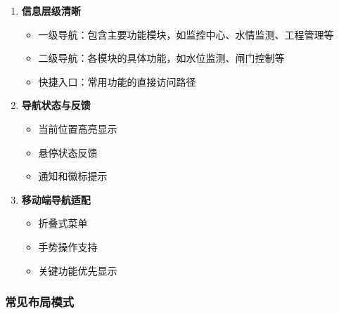 \begin{enumerate}
\def\labelenumi{\arabic{enumi}.}
\tightlist
\item
  \textbf{信息层级清晰}

  \begin{itemize}
  \tightlist
  \item
    一级导航：包含主要功能模块，如监控中心、水情监测、工程管理等
  \item
    二级导航：各模块的具体功能，如水位监测、闸门控制等
  \item
    快捷入口：常用功能的直接访问路径
  \end{itemize}
\item
  \textbf{导航状态与反馈}

  \begin{itemize}
  \tightlist
  \item
    当前位置高亮显示
  \item
    悬停状态反馈
  \item
    通知和徽标提示
  \end{itemize}
\item
  \textbf{移动端导航适配}

  \begin{itemize}
  \tightlist
  \item
    折叠式菜单
  \item
    手势操作支持
  \item
    关键功能优先显示
  \end{itemize}
\end{enumerate}

\subsubsection{常见布局模式}\label{ux5e38ux89c1ux5e03ux5c40ux6a21ux5f0f}

